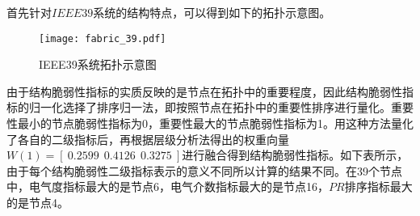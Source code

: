 首先针对$IEEE39$系统的结构特点，可以得到如下的拓扑示意图。
\begin{figure}[H] %
  \centering
  \texttt{[image: fabric\_39.pdf]}
  \caption{IEEE39系统拓扑示意图}
  \label{fig:fabric_39}
\end{figure}

由于结构脆弱性指标的实质反映的是节点在拓扑中的重要程度，因此结构脆弱性指标的归一化选择了排序归一法，即按照节点在拓扑中的重要性排序进行量化。重要性最小的节点脆弱性指标为0，重要性最大的节点脆弱性指标为1。用这种方法量化了各自的二级指标后，再根据层级分析法得出的权重向量$W(1)=\left[~0.2599~~0.4126~~0.3275~\right]$进行融合得到结构脆弱性指标。如下表所示，由于每个结构脆弱性二级指标表示的意义不同所以计算的结果不同。在39个节点中，电气度指标最大的是节点6，电气介数指标最大的是节点16，$PR$排序指标最大的是节点4。

